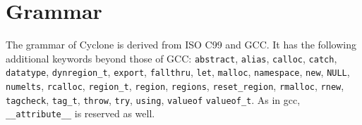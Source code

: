 \section{Grammar}


\newcommand{\rulelabel}[1]{%
  \parbox[b]{\labelwidth}{\makebox[0pt][l]{\hypertarget{#1}{\textit{#1}}:}}}
\newcommand{\ruleoneoflabel}[1]{%
  \parbox[b]{\labelwidth}%
  {\makebox[0pt][l]{\hypertarget{#1}{\textit{#1}}: one of}}}
\newenvironment{rules}[1]{%
  \begin{list}{}{}%
    \renewcommand{\makelabel}{\rulelabel}%
  \item[#1]\mbox{}\\}{\end{list}}
\newenvironment{rulesoneof}[1]{%
  \begin{list}{}{}%
    \renewcommand{\makelabel}{\ruleoneoflabel}%
  \item[#1]\mbox{}\\}{\end{list}}

\newcommand{\nt}[1]{\hyperlink{#1}{\textit{#1}}} %
\newcommand{\tk}[1]{\texttt{#1}}                 %
\newcommand{\opt}{\ensuremath{_{\it\textcolor{bluegray}{opt}}}}

The grammar of Cyclone is derived from ISO C99 and GCC.
It has the following additional keywords beyond those of GCC:
\texttt{abstract}, \texttt{alias}, \texttt{calloc}, 
\texttt{catch}, \texttt{datatype}, \texttt{dynregion_t},
\texttt{export}, 
\texttt{fallthru}, 
\texttt{let}, \texttt{malloc},
\texttt{namespace}, \texttt{new}, \texttt{NULL}, \texttt{numelts},
\texttt{rcalloc}, \texttt{region_t}, \texttt{region}, \texttt{regions}, 
\texttt{reset_region}, 
\texttt{rmalloc}, \texttt{rnew}, \texttt{tagcheck}, \texttt{tag_t},
\texttt{throw}, \texttt{try}, \texttt{using}, \texttt{valueof}
\texttt{valueof_t}.  As in gcc,
\texttt{__attribute__} is reserved as well.

